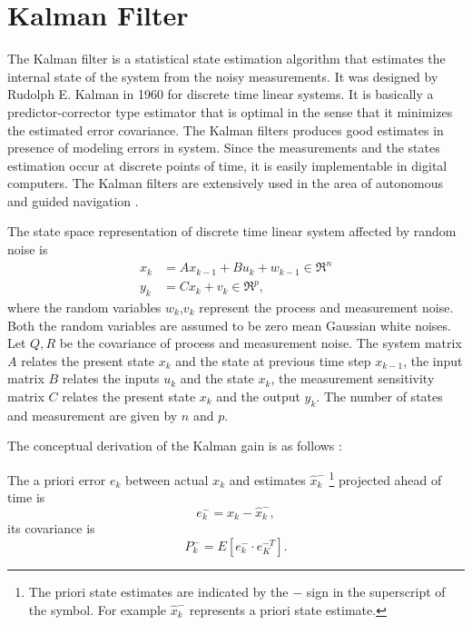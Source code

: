 \section{Kalman Filter}
The Kalman filter is a statistical state estimation algorithm that estimates the internal state of the system from the noisy measurements. It was designed by Rudolph E. Kalman in 1960 for discrete time linear systems. It is basically a predictor-corrector type estimator that is optimal in the sense that it minimizes the estimated error covariance. The Kalman filters produces good estimates in presence of modeling errors in system. Since the measurements and the states estimation occur at discrete points of time, it is easily implementable in digital computers. The Kalman filters are extensively used in the area of autonomous and guided navigation \citep{gre01}.

The state space representation of discrete time linear system affected by random noise is
\begin{equation}
    \begin{split}
        \label{eq:lin_ss}
        x_{k} &= Ax_{k-1} + Bu_k + w_{k-1} \in \Re^{n}\\
        y_k &= Cx_k + v_k \in \Re^{p},
    \end{split}
\end{equation}
where the random variables $w_k$,$v_k$ represent the process and measurement noise. Both the random variables are assumed to be zero mean Gaussian white noises. Let $Q,R$ be the covariance of process and measurement noise. The system matrix $A$ relates the present state $x_k$ and the state at previous time step $x_{k-1}$, the input matrix $B$ relates the inputs $u_k$ and the state $x_k$, the measurement sensitivity matrix $C$ relates the present state $x_k$ and the output $y_k$. The number of states and measurement are given by $n$ and $p$.

The conceptual derivation of the Kalman gain is as follows \citep{gre01} :

The a priori error $e_k$ between actual $x_k$ and estimates $\hat x_k^{-}$ \footnote{The priori state estimates are indicated by the $-$ sign in the superscript of the symbol. For example $\hat x_k^-$ represents a priori state estimate.} projected ahead of time is
 \begin{equation}
	e_k^{-} = x_k - \hat{x}_k^{-},
	\label{eq:kf_err}
\end{equation}
its covariance is
\begin{equation}
	P_k^{-} = E[e_k^{-} \cdot e_K^{-T}].
	\label{eq:kf_P}
\end{equation}

